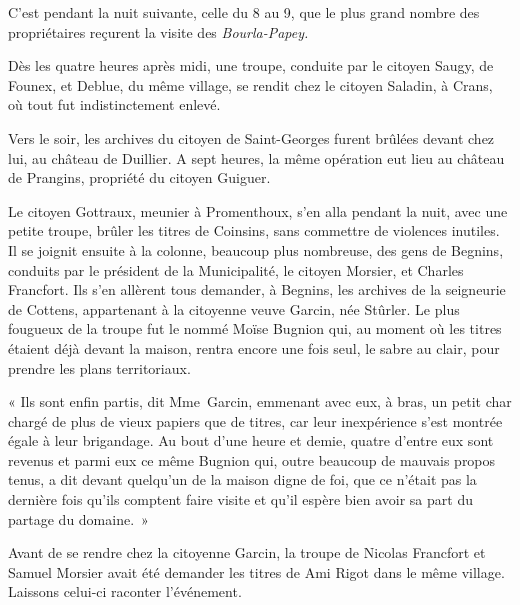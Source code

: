 \documentclass[french,twoside]{book} %
\newenvironment{quoteblock}%
  {\begin{quoting}}
  {\end{quoting}}
\newenvironment{quotebar}{%
    \def\FrameCommand{{\color{rubric!10!}\vrule width 0.5em} \hspace{0.9em}}%
    \def\OuterFrameSep{\itemsep} %
    \MakeFramed {\advance\hsize-\width \FrameRestore}
  }%
  {%
    \endMakeFramed
  }
\renewenvironment{quoteblock}%
  {%
    \savenotes
    \setstretch{0.9}
    \normalfont
    \begin{quotebar}
  }
  {%
    \end{quotebar}
    \spewnotes
  }
\begin{document}
\noindent C’est pendant la nuit suivante, celle du 8 au 9, que le plus grand nombre des propriétaires reçurent la visite des \emph{Bourla-Papey.}\par
Dès les quatre heures après midi, une troupe, conduite par le citoyen Saugy, de Founex, et Deblue, du même village, se rendit chez le citoyen Saladin, à Crans, où tout fut indistinctement enlevé.\par
Vers le soir, les archives du citoyen de Saint-Georges furent brûlées devant chez lui, au château de Duillier. A sept heures, la même opération eut lieu au château de Prangins, propriété du citoyen Guiguer.\par
Le citoyen Gottraux, meunier à Promenthoux, s’en alla pendant la nuit, avec une petite troupe, brûler les titres de Coinsins, sans commettre de violences inutiles. Il se joignit ensuite à la colonne, beaucoup plus nombreuse, des gens de Begnins, conduits par le président de la Municipalité, le citoyen Morsier, et Charles Francfort. Ils s’en allèrent tous demander, à Begnins, les archives de la seigneurie de Cottens, appartenant à la citoyenne veuve Garcin, née Stûrler. Le plus fougueux de la troupe fut le nommé Moïse Bugnion qui, au moment où les titres étaient déjà devant la maison, rentra encore une fois seul, le sabre au clair, pour prendre les plans territoriaux.\par

\begin{quoteblock}
 \noindent « Ils sont enfin partis, dit Mme Garcin, emmenant avec eux, à bras, un petit char chargé de plus de vieux papiers que de titres, car leur inexpérience s’est montrée égale à leur brigandage. Au bout d’une heure et demie, quatre d’entre eux sont revenus et parmi eux ce même Bugnion qui, outre beaucoup de mauvais propos tenus, a dit devant quelqu’un de la maison digne de foi, que ce n’était pas la dernière fois qu’ils comptent faire visite et qu’il espère bien avoir sa part du partage du domaine. »
 \end{quoteblock}

\noindent Avant de se rendre chez la citoyenne Garcin, la troupe de Nicolas Francfort et Samuel Morsier avait été demander les titres de Ami Rigot dans le même village. Laissons celui-ci raconter l’événement.\par
\end{document}
